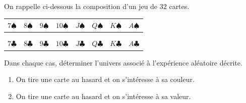 \begin{exo}
	On rappelle ci-dessous la composition d'un jeu de $32$ cartes.

	\begin{center}
		\def\arraystretch{1.6}
		\begin{tabular}{|c|c|c|c|c|c|c|c|} \hline
			$7 \spadesuit$           & $8\spadesuit$            & $9\spadesuit$            & $10\spadesuit$            & $J\spadesuit$            & $Q\spadesuit$            & $K\spadesuit$            & $A\spadesuit$            \\ \hline
			\color{red}{$7\diamondsuit$} & \color{red}{$8\diamondsuit$} & \color{red}{$9\diamondsuit$} & \color{red}{$10\diamondsuit$} & \color{red}{$J\diamondsuit$} & \color{red}{$Q\diamondsuit$} & \color{red}{$K\diamondsuit$} & \color{red}{$A\diamondsuit$} \\ \hline
			\color{red}{$7\heartsuit$}   & \color{red}{$8\heartsuit$}   & \color{red}{$9\heartsuit$}   & \color{red}{$10\heartsuit$}   & \color{red}{$J\heartsuit$}   & \color{red}{$Q\heartsuit$}   & \color{red}{$K\heartsuit$}   & \color{red}{$A\heartsuit$}   \\ \hline
			$7 \clubsuit$            & $8\clubsuit$             & $9\clubsuit$             & $10\clubsuit$             & $J\clubsuit$             & $Q\clubsuit$             & $K\clubsuit$             & $A\clubsuit$             \\ \hline
		\end{tabular}
	\end{center}

	Dans chaque cas, déterminer l'univers associé à l'expérience aléatoire décrite.
	\begin{enumerate}
		\item On tire une carte au hasard et on s'intéresse à sa couleur.
		\item On tire une carte au hasard et on s'intéresse à sa valeur.
	\end{enumerate}
\end{exo}
